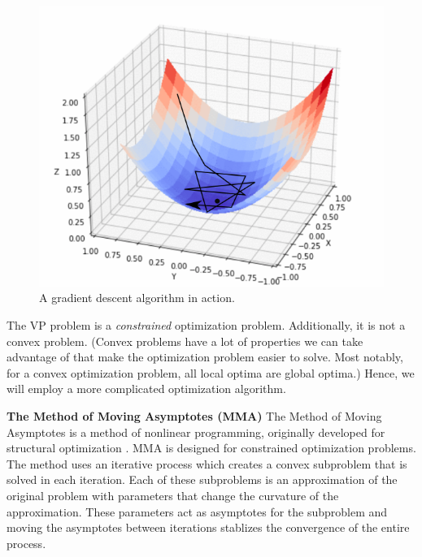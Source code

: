 \documentclass[final]{beamer}
\begin{document}
\begin{frame}
	\begin{figure}
		\centering
		\includegraphics[height=0.75\textheight]{fastlr.png}
		\caption{A gradient descent algorithm in action. \cite{kathuria_2020}}
	\end{figure}
\end{frame}

\begin{frame}{}
	The VP problem is a \textit{constrained} optimization problem.\vfill\pause
	Additionally, it is not a convex problem.\vfill\pause
	(Convex problems have a lot of properties we can take advantage of that make the optimization problem easier to solve. Most notably, for a convex optimization problem, all local optima are global optima.)\vfill\pause
	Hence, we will employ a more complicated optimization algorithm.\vfill
\end{frame}

\begin{frame}[t]{\textbf{The Method of Moving Asymptotes (MMA)}}
	 The Method of Moving Asymptotes is a method of nonlinear programming, originally developed for structural optimization \cite{Svanberg1987}. MMA is designed for constrained optimization problems.
	 \vfill\pause
	 The method uses an iterative process which creates a convex subproblem that is solved in each iteration. Each of these subproblems is an approximation of the original problem with parameters that change the curvature of the approximation.
	 \vfill\pause
	 These parameters act as asymptotes for the subproblem and moving the asymptotes between iterations stablizes the convergence of the entire process.
\end{frame}
\end{document}
